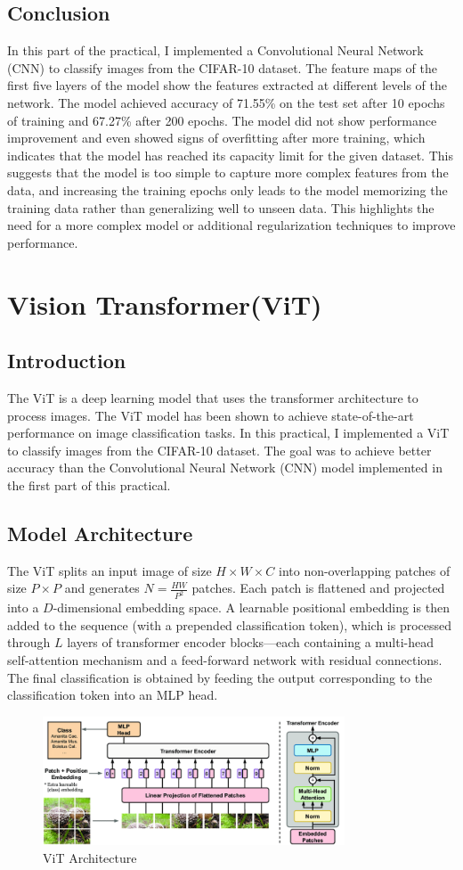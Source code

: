 \documentclass[12pt]{article}
\begin{document}
\subsection{Conclusion}
In this part of the practical, I implemented a Convolutional Neural Network (CNN) to classify images from the CIFAR-10 dataset.
The feature maps of the first five layers of the model show the features extracted at different levels of the network.
The model achieved accuracy of 71.55\% on the test set after 10 epochs of training and 67.27\% after 200 epochs.
The model did not show performance improvement and even showed signs of overfitting after more training, which indicates that the model has reached its capacity limit for the given dataset. 
This suggests that the model is too simple to capture more complex features from the data, and increasing the training epochs only leads to the model memorizing the training data rather than generalizing well to unseen data. 
This highlights the need for a more complex model or additional regularization techniques to improve performance.
\section{Vision Transformer(ViT)}
\subsection{Introduction}
The ViT is a deep learning model that uses the transformer architecture to process images. 
The ViT model has been shown to achieve state-of-the-art performance on image classification tasks. 
In this practical, I implemented a ViT to classify images from the CIFAR-10 dataset. 
The goal was to achieve better accuracy than the Convolutional Neural Network (CNN) model implemented in the first part of this practical.
\subsection{Model Architecture}
The ViT splits an input image of size $H \times W \times C$ into non-overlapping patches of size $P \times P$ and generates $N = \frac{HW}{P^2}$ patches. 
Each patch is flattened and projected into a $D$-dimensional embedding space. 
A learnable positional embedding is then added to the sequence (with a prepended classification token), which is processed through $L$ layers of transformer encoder blocks—each containing a multi-head self-attention mechanism and a feed-forward network with residual connections. 
The final classification is obtained by feeding the output corresponding to the classification token into an MLP head.
\begin{figure}[H]
    \centering
    \includegraphics[width=0.8\textwidth]{./src/vit.png}
    \caption{ViT Architecture}
\end{figure}
\end{document}
